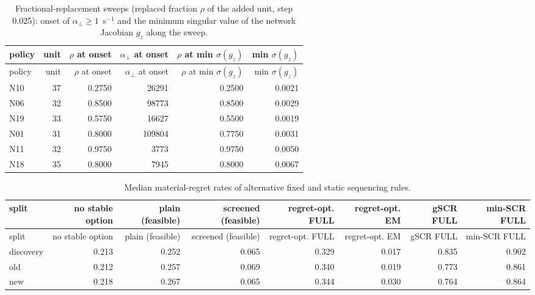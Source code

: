 \documentclass[10pt,a4paper]{article}
\newcommand{\aperp}{\alpha_{\perp}}
\begin{document}
{\scriptsize
\begin{longtable}{lrrrrr}
\caption{Fractional-replacement sweeps (replaced fraction $\rho$ of the added unit, step 0.025): onset of $\aperp\ge1$~s$^{-1}$ and the minimum singular value of the network Jacobian $g_z$ along the sweep.}\label{tab:s-sweep}\\
\toprule
policy & unit & $\rho$ at onset & $\aperp$ at onset & $\rho$ at min $\sigma(g_z)$ & min $\sigma(g_z)$ \\
\midrule
\endfirsthead
\toprule
policy & unit & $\rho$ at onset & $\aperp$ at onset & $\rho$ at min $\sigma(g_z)$ & min $\sigma(g_z)$ \\
\midrule
\endhead
N10 & 37 & 0.2750 & 26291 & 0.2500 & 0.0021 \\
N06 & 32 & 0.8500 & 98773 & 0.8500 & 0.0029 \\
N19 & 33 & 0.5750 & 16627 & 0.5500 & 0.0019 \\
N01 & 31 & 0.8000 & 109804 & 0.7750 & 0.0031 \\
N11 & 32 & 0.9750 & 3773 & 0.9750 & 0.0050 \\
N18 & 35 & 0.8000 & 7945 & 0.8000 & 0.0067 \\
\bottomrule
\end{longtable}}

{\tiny
\begin{longtable}{lrrrrrrr}
\caption{Median material-regret rates of alternative fixed and static sequencing rules.}\label{tab:s-seq}\\
\toprule
split & no stable option & plain (feasible) & screened (feasible) & regret-opt. FULL & regret-opt. EM & gSCR FULL & min-SCR FULL \\
\midrule
\endfirsthead
\toprule
split & no stable option & plain (feasible) & screened (feasible) & regret-opt. FULL & regret-opt. EM & gSCR FULL & min-SCR FULL \\
\midrule
\endhead
discovery & 0.213 & 0.252 & 0.065 & 0.329 & 0.017 & 0.835 & 0.902 \\
old & 0.212 & 0.257 & 0.069 & 0.340 & 0.019 & 0.773 & 0.861 \\
new & 0.218 & 0.267 & 0.065 & 0.344 & 0.030 & 0.764 & 0.864 \\
\bottomrule
\end{longtable}}
\end{document}
